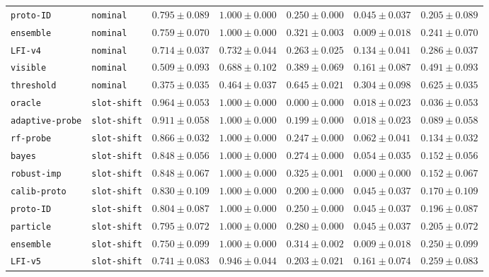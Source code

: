 \documentclass{article}
\begin{document}
\begin{center}
{\begin{tabular}{llccccc}
\texttt{proto-ID} & \texttt{nominal} & $0.795 \pm 0.089$ & $1.000 \pm 0.000$ & $0.250 \pm 0.000$ & $0.045 \pm 0.037$ & $0.205 \pm 0.089$ \\
\texttt{ensemble} & \texttt{nominal} & $0.759 \pm 0.070$ & $1.000 \pm 0.000$ & $0.321 \pm 0.003$ & $0.009 \pm 0.018$ & $0.241 \pm 0.070$ \\
\texttt{LFI-v4} & \texttt{nominal} & $0.714 \pm 0.037$ & $0.732 \pm 0.044$ & $0.263 \pm 0.025$ & $0.134 \pm 0.041$ & $0.286 \pm 0.037$ \\
\texttt{visible} & \texttt{nominal} & $0.509 \pm 0.093$ & $0.688 \pm 0.102$ & $0.389 \pm 0.069$ & $0.161 \pm 0.087$ & $0.491 \pm 0.093$ \\
\texttt{threshold} & \texttt{nominal} & $0.375 \pm 0.035$ & $0.464 \pm 0.037$ & $0.645 \pm 0.021$ & $0.304 \pm 0.098$ & $0.625 \pm 0.035$ \\
\texttt{oracle} & \texttt{slot-shift} & $0.964 \pm 0.053$ & $1.000 \pm 0.000$ & $0.000 \pm 0.000$ & $0.018 \pm 0.023$ & $0.036 \pm 0.053$ \\
\texttt{adaptive-probe} & \texttt{slot-shift} & $0.911 \pm 0.058$ & $1.000 \pm 0.000$ & $0.199 \pm 0.000$ & $0.018 \pm 0.023$ & $0.089 \pm 0.058$ \\
\texttt{rf-probe} & \texttt{slot-shift} & $0.866 \pm 0.032$ & $1.000 \pm 0.000$ & $0.247 \pm 0.000$ & $0.062 \pm 0.041$ & $0.134 \pm 0.032$ \\
\texttt{bayes} & \texttt{slot-shift} & $0.848 \pm 0.056$ & $1.000 \pm 0.000$ & $0.274 \pm 0.000$ & $0.054 \pm 0.035$ & $0.152 \pm 0.056$ \\
\texttt{robust-imp} & \texttt{slot-shift} & $0.848 \pm 0.067$ & $1.000 \pm 0.000$ & $0.325 \pm 0.001$ & $0.000 \pm 0.000$ & $0.152 \pm 0.067$ \\
\texttt{calib-proto} & \texttt{slot-shift} & $0.830 \pm 0.109$ & $1.000 \pm 0.000$ & $0.200 \pm 0.000$ & $0.045 \pm 0.037$ & $0.170 \pm 0.109$ \\
\texttt{proto-ID} & \texttt{slot-shift} & $0.804 \pm 0.087$ & $1.000 \pm 0.000$ & $0.250 \pm 0.000$ & $0.045 \pm 0.037$ & $0.196 \pm 0.087$ \\
\texttt{particle} & \texttt{slot-shift} & $0.795 \pm 0.072$ & $1.000 \pm 0.000$ & $0.280 \pm 0.000$ & $0.045 \pm 0.037$ & $0.205 \pm 0.072$ \\
\texttt{ensemble} & \texttt{slot-shift} & $0.750 \pm 0.099$ & $1.000 \pm 0.000$ & $0.314 \pm 0.002$ & $0.009 \pm 0.018$ & $0.250 \pm 0.099$ \\
\texttt{LFI-v5} & \texttt{slot-shift} & $0.741 \pm 0.083$ & $0.946 \pm 0.044$ & $0.203 \pm 0.021$ & $0.161 \pm 0.074$ & $0.259 \pm 0.083$ \\

\end{tabular}}
\end{center}
\end{document}
